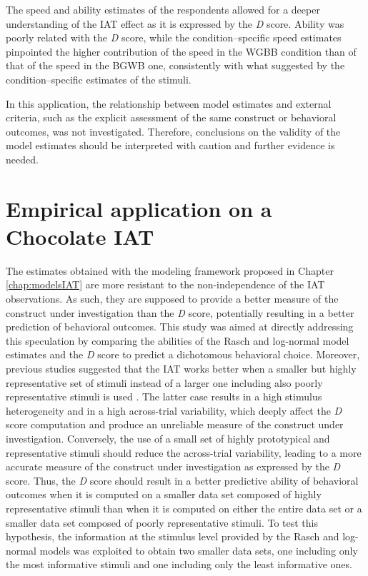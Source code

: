 \documentclass[12pt]{book}
\begin{document}
The speed and ability estimates of the respondents allowed for a deeper understanding of the IAT effect as it is expressed by the \emph{D} score. 
Ability was poorly related with the \emph{D} score, while the condition--specific speed estimates pinpointed the higher contribution of the speed in the WGBB condition than of that of the speed in the BGWB one, consistently with what suggested by the condition--specific estimates of the stimuli. 

In this application, the relationship between model estimates and external criteria, such as the explicit assessment of the same construct or behavioral outcomes, was not investigated. Therefore, conclusions on the validity of the model estimates should be interpreted with caution and further evidence is needed.


\section[Chocolate IAT]{Empirical application on a Chocolate IAT}\label{sec:filling}

The estimates obtained with the modeling framework proposed  in Chapter \ref{chap:modelsIAT} are more resistant to the non-independence of the IAT observations. As such, they are supposed to provide a better measure of the construct under investigation than the \emph{D} score, potentially resulting in a better prediction of behavioral outcomes. 
This study was aimed at directly addressing this speculation by comparing the abilities of the Rasch and log-normal model estimates and the \emph{D} score to predict a dichotomous behavioral choice. 
Moreover, previous studies suggested that the IAT works better when a smaller but highly representative set of stimuli instead of a larger one including also poorly representative stimuli is used \cite{nosek2005}. 
The latter case results in a high stimulus heterogeneity and in a high across-trial variability, which deeply affect the \emph{D} score computation \cite{wols2017} and produce an unreliable measure of the construct under investigation. 
Conversely, the use of a small set of highly prototypical and representative stimuli should reduce the across-trial variability, leading to a more accurate measure of the construct under investigation as expressed by the \emph{D} score.
Thus, the \emph{D} score should result in a better predictive ability of behavioral outcomes when it is computed on a smaller data set composed of highly representative stimuli than when it is computed on either the entire data set or a smaller data set composed of poorly representative stimuli.
To test this hypothesis, the information at the stimulus level provided by the Rasch and log-normal models was exploited to obtain two smaller data sets, one including only the most informative stimuli and one including only the least informative ones. 
\end{document}
